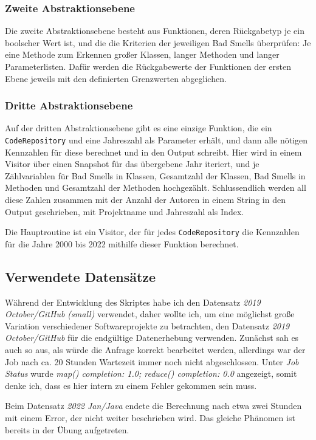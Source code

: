 \documentclass[12pt]{article}
\begin{document}
\subsubsection{Zweite Abstraktionsebene}
Die zweite Abstraktionsebene besteht aus Funktionen, deren Rückgabetyp je ein boolscher Wert ist, und die die Kriterien der jeweiligen Bad Smells überprüfen: Je eine Methode zum Erkennen großer Klassen, langer Methoden und langer Parameterlisten.
Dafür werden die Rückgabewerte der Funktionen der ersten Ebene jeweils mit den definierten Grenzwerten abgeglichen.

\subsubsection{Dritte Abstraktionsebene}
Auf der dritten Abstraktionsebene gibt es eine einzige Funktion, die ein \texttt{CodeRepository} und eine Jahreszahl als Parameter erhält, und dann alle nötigen Kennzahlen für diese berechnet und in den Output schreibt.
Hier wird in einem Visitor über einen Snapshot für das übergebene Jahr iteriert, und je Zählvariablen für Bad Smells in Klassen, Gesamtzahl der Klassen, Bad Smells in Methoden und Gesamtzahl der Methoden hochgezählt.
Schlussendlich werden all diese Zahlen zusammen mit der Anzahl der Autoren in einem String in den Output geschrieben, mit Projektname und Jahreszahl als Index.

Die Hauptroutine ist ein Visitor, der für jedes \texttt{CodeRepository} die Kennzahlen für die Jahre 2000 bis 2022 mithilfe dieser Funktion berechnet.

\subsection{Verwendete Datensätze}
Während der Entwicklung des Skriptes habe ich den Datensatz \emph{2019 October/GitHub (small)} verwendet, daher wollte ich, um eine möglichst große Variation verschiedener Softwareprojekte zu betrachten, den Datensatz \emph{2019 October/GitHub} für die endgültige Datenerhebung verwenden.
Zunächst sah es auch so aus, als würde die Anfrage korrekt bearbeitet werden, allerdings war der Job nach ca. 20 Stunden Wartezeit immer noch nicht abgeschlossen.
Unter \emph{Job Status} wurde \emph{map() completion: 1.0; reduce() completion: 0.0} angezeigt, somit denke ich, dass es hier intern zu einem Fehler gekommen sein muss.

Beim Datensatz \emph{2022 Jan/Java} endete die Berechnung nach etwa zwei Stunden mit einem Error, der nicht weiter beschrieben wird.
Das gleiche Phänomen ist bereits in der Übung aufgetreten.
\end{document}
